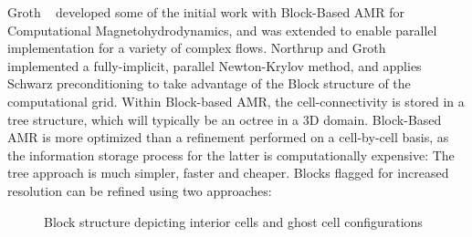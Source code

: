 Groth \etal ~\cite{Groth:1999} developed some of the initial work with Block-Based AMR for Computational Magnetohydrodynamics, and was extended to enable parallel implementation for a variety of complex flows. Northrup and Groth ~\cite{Northrup:2005b} implemented a fully-implicit, parallel Newton-Krylov method, and applies Schwarz preconditioning to take advantage of the Block structure of the computational grid.
Within Block-based AMR, the cell-connectivity is stored in a tree structure, which will typically be an octree in a 3D domain. Block-Based AMR is more optimized than a refinement performed on a cell-by-cell basis, as the information storage process for the latter is computationally expensive: The tree approach is much simpler, faster and cheaper. Blocks flagged for increased resolution can be refined using two approaches: \par

  
\begin{figure}[t!]
  \centering
	\:
     \caption{Block structure depicting interior cells and ghost cell configurations}  
\end{figure}  
  

